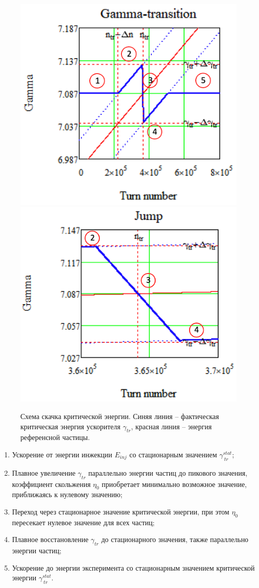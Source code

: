 \documentclass[a4paper]{panl}
\begin{document}
\begin{figure}[!h]
   \includegraphics*[width=.49\columnwidth]{img/fig_01-1}
   \includegraphics*[width=.49\columnwidth]{img/fig_01-2}
   \caption{Схема скачка критической энергии. Синяя линия – фактическая критическая энергия ускорителя $\gamma_{tr}$, красная линия – энергия референсной частицы.}
   \label{fig:jump}
\end{figure}

\begin{enumerate} 
  \item Ускорение от энергии инжекции $E_{inj}$ со стационарным значением $\gamma_{\ tr}^{stat}$;
  \item  Плавное увеличение $\gamma_{tr}$ параллельно энергии частиц до пикового значения, коэффициент скольжения $\eta_0$ приобретает минимально возможное значение, приближаясь к нулевому значению;
  \item Переход через стационарное значение критической энергии, при этом $\eta_0$ пересекает нулевое значение для всех частиц;
  \item Плавное восстановление $\gamma_{tr}$ до стационарного значения, также па\-рал\-лель\-но энергии частиц;
  \item Ускорение до энергии эксперимента со стационарным значением критической энергии $\gamma_{\ tr}^{stat}$.
  \end{enumerate}
 
\end{document}
